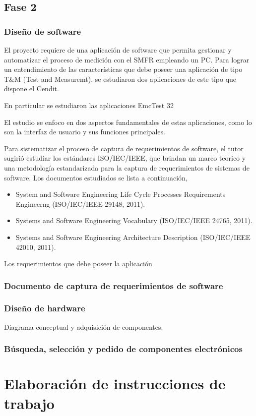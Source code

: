 \documentclass[paper=letter,oneside,fontsize=11pt, parskip=full]{scrartcl}
\begin{document}
	\subsection{Fase 2}
	\subsubsection{Diseño de software}
	
	El proyecto requiere de una aplicación de software que permita gestionar y automatizar el proceso de medición con el SMFR empleando un PC. Para lograr un entendimiento de las características que debe poseer una aplicación de tipo T\&M (Test and Measuremt), se estudiaron dos aplicaciones de este tipo que dispone el Cendit.
	
	En particular se estudiaron las aplicaciones EmcTest 32
	
	El estudio se enfoco en dos aspectos fundamentales de estas aplicaciones, como lo son la interfaz de usuario y sus funciones principales. 
	
	Para sistematizar el proceso de captura de requerimientos de software, el tutor sugirió estudiar los estándares ISO/IEC/IEEE, que brindan un marco teorico y una metodología estandarizada para la captura de requerimientos de sistemas de software. Los documentos estudiados se lista a continuación,
	
	\begin{itemize}  
		\item System and Software Engineering Life Cycle Processes Requirements Engineerng (ISO/IEC/IEEE 29148, 2011).
		\item Systems and Software Engineering Vocabulary (ISO/IEC/IEEE 24765, 2011).
		\item Systems and Software Engineering Architecture Description (ISO/IEC/IEEE 42010, 2011).		
	\end{itemize}
	
	Los requerimientos que debe poseer la aplicación
	
	\subsubsection{Documento de captura de requerimientos de software}
	
	\subsubsection{Diseño de hardware}	
	
	Diagrama conceptual y adquisición de componentes.
	
	\subsubsection{Búsqueda, selección y pedido de componentes electrónicos}
	
	\section{Elaboración de instrucciones de trabajo}

	

	
\end{document}
